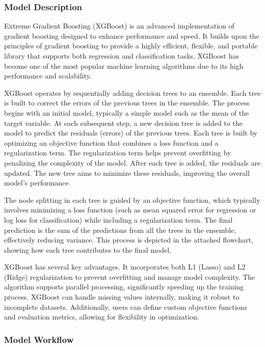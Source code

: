 \documentclass[
  letterpaper,
  DIV=11,
  numbers=noendperiod]{scrartcl}
\begin{document}
\subsubsection{Model Description}\label{model-description-4}

Extreme Gradient Boosting (XGBoost) is an advanced implementation of
gradient boosting designed to enhance performance and speed. It builds
upon the principles of gradient boosting to provide a highly efficient,
flexible, and portable library that supports both regression and
classification tasks. XGBoost has become one of the most popular machine
learning algorithms due to its high performance and scalability.

XGBoost operates by sequentially adding decision trees to an ensemble.
Each tree is built to correct the errors of the previous trees in the
ensemble. The process begins with an initial model, typically a simple
model such as the mean of the target variable. At each subsequent step,
a new decision tree is added to the model to predict the residuals
(errors) of the previous trees. Each tree is built by optimizing an
objective function that combines a loss function and a regularization
term. The regularization term helps prevent overfitting by penalizing
the complexity of the model. After each tree is added, the residuals are
updated. The new tree aims to minimize these residuals, improving the
overall model's performance.

The node splitting in each tree is guided by an objective function,
which typically involves minimizing a loss function (such as mean
squared error for regression or log loss for classification) while
including a regularization term. The final prediction is the sum of the
predictions from all the trees in the ensemble, effectively reducing
variance. This process is depicted in the attached flowchart, showing
how each tree contributes to the final model.

XGBoost has several key advantages. It incorporates both L1 (Lasso) and
L2 (Ridge) regularization to prevent overfitting and manage model
complexity. The algorithm supports parallel processing, significantly
speeding up the training process. XGBoost can handle missing values
internally, making it robust to incomplete datasets. Additionally, users
can define custom objective functions and evaluation metrics, allowing
for flexibility in optimization.

\subsubsection{Model Workflow}\label{model-workflow-4}
\end{document}
